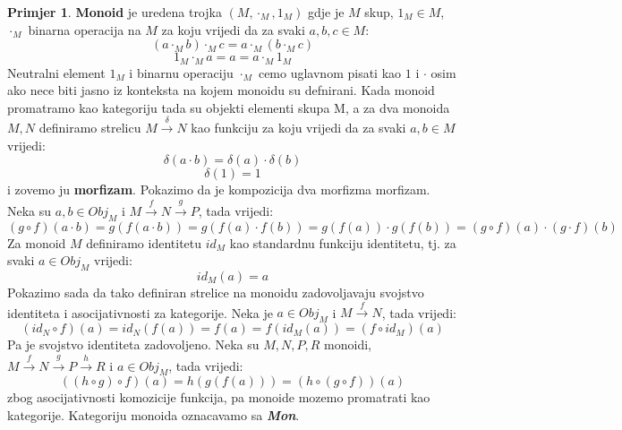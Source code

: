 \documentclass[11pt]{article}
\newcommand{\bold}[1]{\textbf{#1}}
\newcommand{\category}[1]{\bold{\emph{#1}}}
\theoremstyle{definition}
\newtheorem{primjer}{Primjer}
\begin{document}
  \begin{primjer}
    \bold{Monoid} je uredena trojka $(M, \cdot_M, 1_M)$ gdje je $M$ skup, $1_M
    \in M$, $\cdot_M$ binarna operacija na $M$ za koju vrijedi da za svaki $a, b, c \in M$:
    \begin{equation*}
      (a \cdot_M b) \cdot_M c = a \cdot_M (b \cdot_M c)
    \end{equation*}
    \begin{equation*}
      1_M \cdot_M a = a = a \cdot_M 1_M
    \end{equation*}
    Neutralni element $1_M$ i binarnu operaciju $\cdot_M$ cemo uglavnom pisati
    kao $1$ i $\cdot$ osim ako nece biti jasno iz konteksta na kojem monoidu
    su defnirani.
    Kada monoid promatramo kao kategoriju tada su objekti elementi skupa M, a
    za dva monoida $M, N$ definiramo strelicu $M \xrightarrow{\delta} N$ kao
    funkciju za koju vrijedi da za svaki $a, b \in M$ vrijedi:
    \begin{equation*}
      \delta(a \cdot b) = \delta(a) \cdot \delta(b)
    \end{equation*}
    \begin{equation*}
      \delta(1) = 1
    \end{equation*}
    i zovemo ju \bold{morfizam}.
    Pokazimo da je kompozicija dva morfizma morfizam.
    Neka su $a, b \in Obj_M$ i $M \xrightarrow{f} N \xrightarrow{g} P$, tada vrijedi:
    \begin{equation*}
      (g \circ f)(a \cdot b) = g(f(a \cdot b)) = g(f(a) \cdot f(b)) = g(f(a))
      \cdot g(f(b)) = (g \circ f)(a) \cdot (g \cdot f)(b)
    \end{equation*}
    Za monoid $M$ definiramo identitetu $id_M$ kao standardnu funkciju
    identitetu, tj. za svaki $a \in Obj_M$ vrijedi:
    \begin{equation*}
      id_M(a) = a
    \end{equation*}
    Pokazimo sada da tako definiran strelice na monoidu zadovoljavaju
    svojstvo identiteta i asocijativnosti za kategorije.
    Neka je $a \in Obj_M$ i $M \xrightarrow{f} N$, tada vrijedi:
    \begin{equation*}
      (id_N \circ f)(a) = id_N(f(a)) = f(a) = f(id_M(a)) = (f \circ id_M)(a)
    \end{equation*}
    Pa je svojstvo identiteta zadovoljeno.
    Neka su $M, N, P, R$ monoidi, $M \xrightarrow{f} N \xrightarrow{g} P \xrightarrow{h} R$
    i $a \in Obj_M$, tada vrijedi:
    \begin{equation*}
      ((h \circ g) \circ f)(a) = h(g(f(a))) = (h \circ (g \circ f))(a)
    \end{equation*}
    zbog asocijativnosti komozicije funkcija, pa monoide mozemo promatrati kao
    kategorije. Kategoriju monoida oznacavamo sa \category{Mon}.
  \end{primjer}
\end{document}
